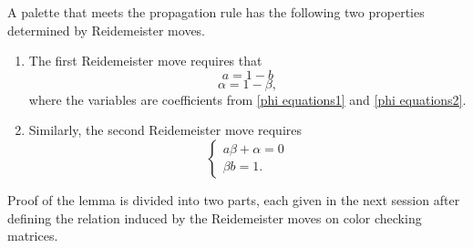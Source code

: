     \begin{lemma}\label{warunki na palete}
  A palette that meets the propagation rule has the following two properties determined by Reidemeister moves.
  \begin{enumerate}
    \item The first Reidemeister move requires that
      $$a=1-b$$
      $$\alpha=1-\beta,$$
      where the variables are coefficients from \eqref{phi equations1} and \eqref{phi equations2}.  
    \item Similarly, the second Reidemeister move requires
      $$\begin{cases}
        a\beta+\alpha=0\\ 
        \beta b=1.
      \end{cases}$$
  \end{enumerate}
\end{lemma}

Proof of the lemma is divided into two parts, each given in the next session after defining the  relation induced by the Reidemeister moves on color checking matrices.
